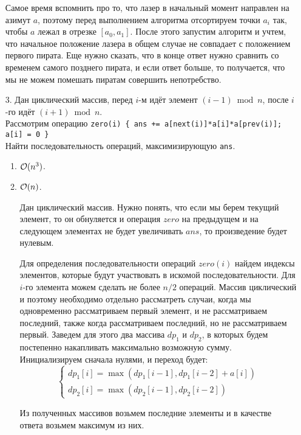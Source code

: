 \begin{enumerate}
\begin{solution}
    Самое время вспомнить про то, что лазер в начальный момент направлен на азимут $a$, поэтому перед выполнением алгоритма отсортируем точки $a_i$ так, чтобы $a$ лежал в отрезке $[a_0, a_1]$. После этого запустим алгоритм и учтем, что начальное положение лазера в общем случае не совпадает с положением первого пирата. Еще нужно сказать, что в конце ответ нужно сравнить со временем самого позднего пирата, и если ответ больше, то получается, что мы не можем помешать пиратам совершить непотребство.
  \end{solution}
    

  \item[3.]
    Дан циклический массив, перед $i$-м идёт элемент $(i{-}1) \bmod n$,
    после $i$-го идёт $(i{+}1) \bmod n$. \\
    Рассмотрим операцию \texttt{zero(i) \{ ans += a[next(i)]*a[i]*a[prev(i)]; a[i] = 0 \}}\\
    Найти последовательность операций, максимизирующую \texttt{ans}.
    \begin{enumerate}
      \item $\mathcal{O}(n^3)$.
      \item $\mathcal{O}(n)$.
      \begin{solution}
        Дан циклический массив. Нужно понять, что если мы берем текущий элемент, то он обнуляется и операция $zero$ на предыдущем и на следующем элементах не будет увеличивать $ans$, то произведение будет нулевым.

        Для определения последовательности операций $zero(i)$ найдем индексы элементов, которые будут участвовать в искомой последовательности. Для $i$-го элемента можем сделать не более $n/2$ операций. Массив циклический и поэтому необходимо отдельно рассматреть случаи, когда мы одновременно рассматриваем первый элемент, и не рассматриваем последний, также когда рассматриваем последний, но не рассматриваем первый. Заведем для этого два массива $dp_1$ и $dp_2$, в которых будем постепенно накапливать максимально возможную сумму. Инициализируем сначала нулями, и переход будет:
        \begin{equation}
          \begin{cases}
            dp_1[i] = \max(dp_1[i-1], dp_1[i-2] + a[i]) \\
            dp_2[i] = \max(dp_2[i-1], dp_2[i-2])
          \end{cases}
        \end{equation}
      \end{solution}
      Из полученных массивов возьмем последние элементы и в качестве ответа возьмем максимум из них.
    \end{enumerate}


\end{enumerate}
